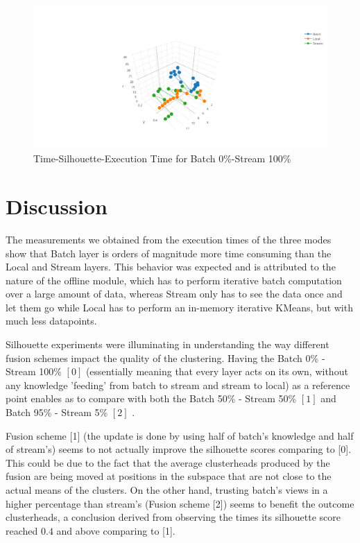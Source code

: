 \documentclass{lmproj}
\begin{document}
\bigskip

\begin{figure}[H]
	\centering	
	\includegraphics[scale=0.5]{3d/k_5_f_0_100}
	\caption{Time-Silhouette-Execution Time for Batch 0\%-Stream 100\%}
\end{figure}



\section{Discussion}
\label{evaluation}

The measurements we obtained from the execution times of the three modes show that Batch layer is orders of magnitude more time consuming than the Local and Stream layers. This behavior was expected and is attributed to the nature of the offline module, which has to perform iterative batch computation over a large amount of data, whereas Stream only has to see the data once and let them go while Local has to perform an in-memory iterative KMeans, but with much less datapoints.

Silhouette experiments were illuminating in understanding the way different fusion schemes impact the quality of the clustering. Having the Batch 0\% - Stream 100\% $[0]$ (essentially meaning that every layer acts on its own, without any knowledge 'feeding' from batch to stream and stream to local) as a reference point enables as to compare with both the Batch 50\% - Stream 50\% $[1]$ and Batch 95\% - Stream 5\% $[2]$ .

Fusion scheme [1] (the update is done by using half of batch's knowledge and half of stream's) seems to not actually improve the silhouette scores comparing to [0]. This could be due to the fact that the average clusterheads produced by the fusion are being moved at positions in the subspace that are not close to the actual means of the clusters. On the other hand, trusting batch's views in a higher percentage than stream's  (Fusion scheme [2]) seems to benefit the outcome clusterheads, a conclusion derived from observing the times its silhouette score reached $0.4$ and above comparing to [1].
\end{document}
